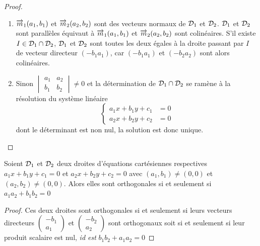\begin{proof}
    \begin{enumerate}
        \item \(\overrightarrow{m}_1(a_1 , b_1)\) et \(\overrightarrow{m}_2(a_2 , b_2)\) sont des 
            vecteurs normaux de \(\mathcal{D}_1\) et \(\mathcal{D}_2\). \(\mathcal{D}_1\) et \(\mathcal{D}_2\) 
            sont parallèles équivaut à \(\overrightarrow{m}_1(a_1 , b_1)\) et 
            \(\overrightarrow{m}_2(a_2 , b_2)\) sont colinéaires. S'il existe \(I \in \mathcal{D}_1 
            \cap \mathcal{D}_2\), \(\mathcal{D}_1\) et \(\mathcal{D}_2\) sont toutes les deux égales à 
            la droite passant par \(I\) de vecteur directeur \((-b_1 a_1)\), car 
            \((-b_1 a_1)\) et \((-b_2 a_2)\) sont alors colinéaires.
        \item Sinon \(\begin{vmatrix} a_1 & a_2 \\ b_1 & b_2 \end{vmatrix} \neq 
            0\) et la détermination de \(\mathcal{D}_1 \cap \mathcal{D}_2\) se ramène à la 
            résolution du système linéaire
            \begin{equation}
                \begin{cases}
                    a_1x + b_1y + c_1 & = 0 \\
                    a_2x + b_2y + c_2 & = 0
                \end{cases}
            \end{equation}
            dont le déterminant est non nul, la solution est donc unique.
    \end{enumerate}
\end{proof}

\begin{prop}
    Soient \(\mathcal{D}_1\) et \(\mathcal{D}_2\) deux droites d'équations cartésiennes 
    respectives \(a_1x + b_1y + c_1 = 0\) et \(a_2x + b_2y + c_2 = 0\) avec 
    \((a_1 , b_1) \neq (0 , 0)\) et \((a_2 , b_2) \neq (0 , 0)\). Alors elles sont 
    orthogonales si et seulement si \(a_1 a_2 + b_1 b_2 = 0\)
\end{prop}

\begin{proof}
    Ces deux droites sont orthogonales si et seulement si leurs vecteurs 
    directeurs \(\begin{pmatrix} -b_1 \\ a_1 \end{pmatrix}\) et 
    \(\begin{pmatrix} -b_2 \\ a_2 \end{pmatrix}\) sont orthogonaux soit si et 
    seulement si leur produit scalaire est nul, \emph{id est} \(b_1 b_2 + a_1 
    a_2 = 0\)
\end{proof}

